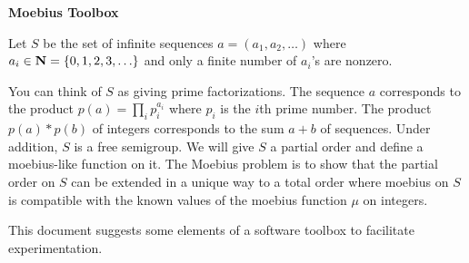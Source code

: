 \documentclass{article}
\begin{document}
  
\begin{center} {\bf Moebius Toolbox} \end{center}

Let $S$ be the set of infinite sequences  $a=(a_1, a_2, \dots)$ where $a_i\in {\bf N} = \{0, 1, 2, 3, \ldots\}$ and only a finite number of $a_i$'s are nonzero.



You can think of $S$ as giving prime factorizations.  The sequence $a$ corresponds to the product $p(a) =\prod_i p_i^{a_i} $ where $p_i$ is the $i$th prime number.   The product $p(a)*p(b)$ of integers corresponds to the sum $a+b$ of sequences.  Under addition, $S$ is a free semigroup. We will give $S$  a partial order and define a moebius-like function on it. The Moebius problem is to show that  the partial order on $S$  can be extended in a unique way to a total order  where moebius on $S$ is compatible with the known values of the moebius function $\mu$ on integers.  

This document suggests some elements of a software toolbox to facilitate experimentation.   
\end{document}
